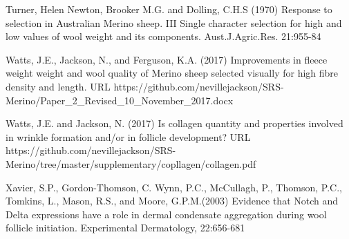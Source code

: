 \documentclass[titlepage]{article}  %
\begin{document}
\begin{thebibliography}{99}
Turner, Helen Newton, Brooker M.G. and Dolling, C.H.S (1970) Response to selection in Australian Merino sheep. III Single character selection for high and low values of wool weight and its components. Aust.J.Agric.Res. 21:955-84

Watts, J.E., Jackson, N., and Ferguson, K.A. (2017) Improvements in fleece weight weight and wool quality of Merino sheep selected visually for high fibre density and length. URL https://github.com/nevillejackson/SRS-Merino/Paper\_2\_Revised\_10\_November\_2017.docx 

Watts, J.E. and Jackson, N. (2017) Is collagen quantity and properties involved in wrinkle formation and/or in follicle development? URL https://github.com/nevillejackson/SRS-Merino/tree/master/supplementary/copllagen/collagen.pdf

Xavier, S.P., Gordon-Thomson, C. Wynn, P.C., McCullagh, P., Thomson, P.C., Tomkins, L., Mason, R.S., and Moore, G.P.M.(2003) Evidence that Notch and Delta expressions have a role in dermal condensate aggregation during wool follicle initiation. Experimental Dermatology, 22:656-681

\end{thebibliography}
\end{document}
